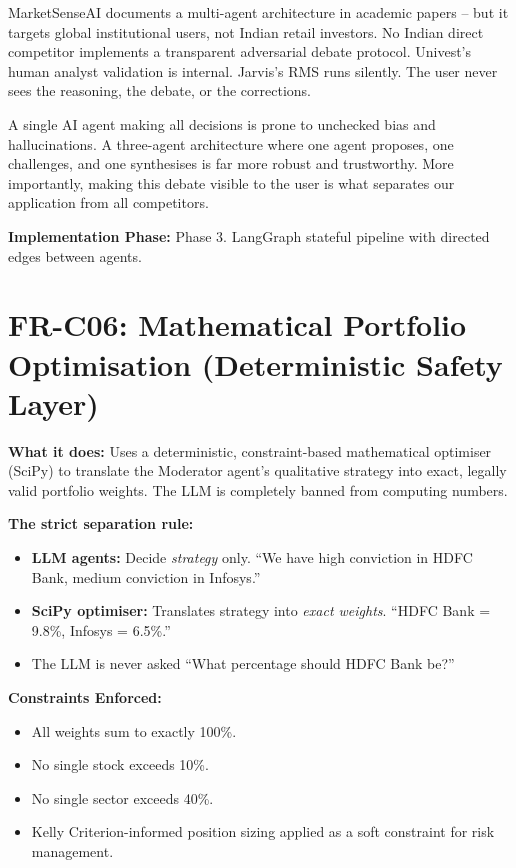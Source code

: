 \documentclass[12pt, a4paper, openany, oneside]{report}
\begin{document}
\begin{gapbox}
MarketSenseAI documents a multi-agent architecture in academic papers -- but it targets global institutional users, not Indian retail investors. No Indian direct competitor implements a transparent adversarial debate protocol. Univest's human analyst validation is internal. Jarvis's RMS runs silently. The user never sees the reasoning, the debate, or the corrections.
\end{gapbox}

\begin{valuebox}
A single AI agent making all decisions is prone to unchecked bias and hallucinations. A three-agent architecture where one agent proposes, one challenges, and one synthesises is far more robust and trustworthy. More importantly, making this debate visible to the user is what separates our application from all competitors.
\end{valuebox}

\textbf{Implementation Phase:} Phase 3. LangGraph stateful pipeline with directed edges between agents.

\section{FR-C06: Mathematical Portfolio Optimisation (Deterministic Safety Layer)}

\textbf{What it does:} Uses a deterministic, constraint-based mathematical optimiser (SciPy) to translate the Moderator agent's qualitative strategy into exact, legally valid portfolio weights. The LLM is completely banned from computing numbers.

\textbf{The strict separation rule:}
\begin{itemize}
  \item \textbf{LLM agents:} Decide \textit{strategy} only. ``We have high conviction in HDFC Bank, medium conviction in Infosys.''
  \item \textbf{SciPy optimiser:} Translates strategy into \textit{exact weights}. ``HDFC Bank = 9.8\%, Infosys = 6.5\%.''
  \item The LLM is never asked ``What percentage should HDFC Bank be?''
\end{itemize}

\textbf{Constraints Enforced:}
\begin{itemize}
  \item All weights sum to exactly 100\%.
  \item No single stock exceeds 10\%.
  \item No single sector exceeds 40\%.
  \item Kelly Criterion-informed position sizing applied as a soft constraint for risk management.
\end{itemize}
\end{document}
